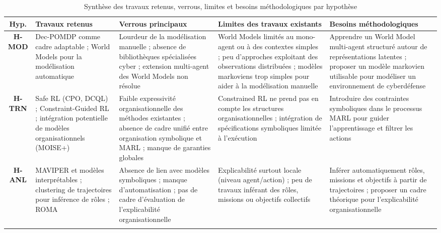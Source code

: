 \begin{table}[h!]
  \centering
  \caption{Synthèse des travaux retenus, verrous, limites et besoins méthodologiques par hypothèse}
  \label{tab:synthese_hypotheses}
  \renewcommand{\arraystretch}{1.2}
  {%
    \footnotesize
    \begin{tabularx}{\textwidth}{cXXXX}
      \hline
      \textbf{Hyp.}
       & \textbf{Travaux retenus}
       & \textbf{Verrous principaux}
       & \textbf{Limites des travaux existants}
       & \textbf{Besoins méthodologiques}                                                                                                                                                                      \\
      \hline

      \textbf{H-MOD}
       & Dec-POMDP comme cadre adaptable ; World Models pour la modélisation automatique
       & Lourdeur de la modélisation manuelle ; absence de bibliothèques spécialisées cyber ; extension multi-agent des World Models non résolue
       & World Models limités au mono-agent ou à des contextes simples ; peu d'approches exploitant des observations distribuées ; modèles markoviens trop simples pour aider à la modélisation manuelle
       & Apprendre un World Model multi-agent structuré autour de représentations latentes ; proposer un modèle markovien utilisable pour modéliser un environnement de cyberdéfense                           \\
      \hdashline

      \textbf{H-TRN}
       & Safe RL (CPO, DCQL) ; Constraint-Guided RL ; intégration potentielle de modèles organisationnels (MOISE+)
       & Faible expressivité organisationnelle des méthodes existantes ; absence de cadre unifié entre organisation symbolique et MARL ; manque de garanties globales
       & Constrained RL ne prend pas en compte les structures organisationnelles ; intégration de spécifications symboliques limitée à l'exécution
       & Introduire des contraintes symboliques dans le processus MARL pour guider l'apprentissage et filtrer les actions                                                                                      \\
      \hdashline

      \textbf{H-ANL}
       & MAVIPER et modèles interprétables ; clustering de trajectoires pour inférence de rôles ; ROMA
       & Absence de lien avec modèles symboliques ; manque d'automatisation ; pas de cadre d'évaluation de l'explicabilité organisationnelle
       & Explicabilité surtout locale (niveau agent/action) ; peu de travaux inférant des rôles, missions ou objectifs collectifs
       & Inférer automatiquement rôles, missions et objectifs à partir de trajectoires ; proposer un cadre théorique pour l'explicabilité organisationnelle                                                    \\
      \hdashline


\end{tabularx}}
\end{table}
